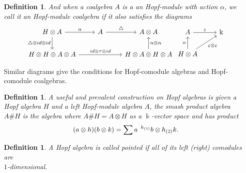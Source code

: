 \documentclass[12pt,a4paper]{article}
\newtheorem{definition}[theorem]{Definition}
\newcommand{\kk}{\Bbbk}
\newcommand\1{_{(1)}}
\newcommand\2{_{(2)}}
\begin{document}
\begin{definition}
And when a coalgebra $A$ is a an Hopf-module with action $\alpha$, we call it an Hopf-module coalgebra if it also satisfies the diagrams
\[
\begin{tikzcd}
H\otimes A \arrow[r, "\alpha"] \arrow[d, "\triangle\otimes id\otimes id"'] & A \arrow[r, "\triangle"] & A\otimes A                                                     \\
H\otimes H\otimes A\otimes A \arrow[rr, "id\otimes\tau\otimes id"]         &                          & H\otimes A\otimes H\otimes A \arrow[u, "\alpha\otimes\alpha"']
\end{tikzcd}
\begin{tikzcd}
A \arrow[r, "\varepsilon"]                                                  & \kk \\
H\otimes A \arrow[u, "\alpha"] \arrow[ru, "\varepsilon\otimes\varepsilon"'] &    
\end{tikzcd}
\]
\end{definition}

Similar diagrams give the conditions for Hopf-comodule algebras and Hopf-comodule coalgebras.\\


\begin{definition}
A useful and prevalent construction on Hopf algebras is given a Hopf algebra $H$ and a left Hopf-module algebra $A$, the smash product algebra $A\# H$ is the algebra where $A\#H=A\otimes H$ as a $\kk$-vector space and has product
\[
(a\otimes h)(b\otimes k)=\sum a\;\prescript{h\1}{}b\otimes h\2 k.
\]
\end{definition}

\begin{definition}
    A Hopf algebra is called pointed if all of its left (right) comodules are \\$1$-dimensional.
\end{definition}
\end{document}
